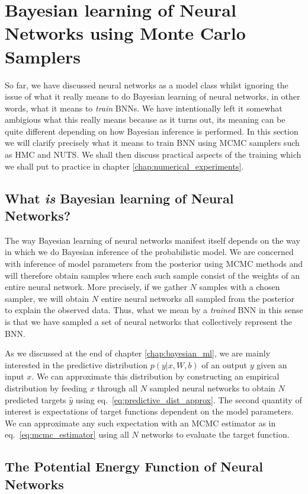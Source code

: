 \section{Bayesian learning of Neural Networks using Monte Carlo Samplers}
So far, we have discussed neural networks as a model class whilst ignoring the issue of what it really means to do Bayesian learning of neural networks, 
in other words, what it means to \textit{train} BNNs. We have intentionally left it somewhat ambigious what this really means because as it turns out, its meaning can be quite different depending on how Bayesian inference is performed. In this section we will clarify precisely what it means to train BNN using MCMC samplers such as HMC and NUTS. We shall then discuss practical aspects of the training which we shall put to practice in chapter \ref{chap:numerical_experiments}.

\subsection{What \textit{is} Bayesian learning of Neural Networks?}
The way Bayesian learning of neural networks manifest itself depends on the way in which we do Bayesian inference of the probabilistic model. 
We are concerned with inference of model parameters from the posterior using MCMC methods and will therefore obtain samples where each such sample
consist of the weights of an entire neural network. More precisely, if we gather $N$ samples with a chosen sampler, we will obtain $N$ entire neural networks
all sampled from the posterior to explain the observed data. Thus, what we mean by a \textit{trained} BNN in this sense is that we have
sampled a set of neural networks that collectively represent the BNN. 

As we discussed at the end of chapter \ref{chap:bayesian_ml}, 
we are mainly interested in the predictive distribution $p(y|x, W, b)$ of an output $y$ given an input $x$. We can approximate this distribution by constructing an empirical distribution by feeding $x$ through all $N$ sampled neural networks to obtain $N$ predicted targets $\hat{y}$ using eq.~\eqref{eq:predictive_dist_approx}.
The second quantity of interest is expectations of target functions dependent on the model parameters. 
We can approximate any such expectation with an MCMC estimator as in eq.~\eqref{eq:mcmc_estimator} using all $N$ networks to evaluate the target function.


\subsection{The Potential Energy Function of Neural Networks}

